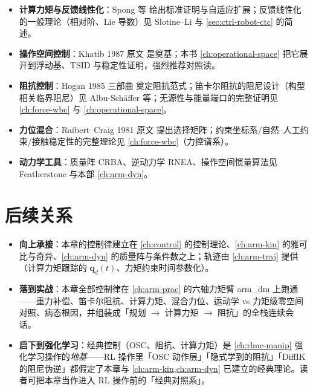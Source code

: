 \begin{itemize}
  \item \textbf{计算力矩与反馈线性化}：Spong 等\cite{spong2006robot} 给出标准证明与自适应扩展；反馈线性化的一般理论（相对阶、Lie 导数）见 Slotine--Li\cite{slotine1991applied} 与 \cref{sec:ctrl-robot-ctc} 的简述。
  \item \textbf{操作空间控制}：Khatib 1987 原文\cite{khatib1987operational} 是奠基；本书 \cref{ch:operational-space} 把它展开到浮动基、TSID 与稳定性证明，强烈推荐对照读。
  \item \textbf{阻抗控制}：Hogan 1985 三部曲\cite{hogan1985impedance} 奠定阻抗范式；笛卡尔阻抗的阻尼设计（构型相关临界阻尼）见 Albu-Schäffer 等\cite{albu2003cartesian}；无源性与能量端口的完整证明见 \cref{ch:force-wbc} 与 \cref{ch:operational-space}。
  \item \textbf{力位混合}：Raibert--Craig 1981 原文\cite{raibert1981hybrid} 提出选择矩阵；约束坐标系/自然--人工约束/接触稳定性的完整理论见 \cref{ch:force-wbc}（力控谱系）。
  \item \textbf{动力学工具}：质量阵 CRBA、逆动力学 RNEA、操作空间惯量算法见 Featherstone\cite{featherstone2008rbda} 与本部 \cref{ch:arm-dyn}。
\end{itemize}

\section{后续关系}
\label{sec:actrl-next}

\begin{itemize}
  \item \textbf{向上承接}：本章的控制律建立在 \cref{ch:control} 的控制理论、\cref{ch:arm-kin} 的雅可比与奇异、\cref{ch:arm-dyn} 的质量阵与条件数之上；轨迹由 \cref{ch:arm-traj} 提供（计算力矩跟踪的 $\mathbf{q}_d(t)$、力矩约束时间参数化）。
  \item \textbf{落到实战}：本章全部控制律在 \cref{ch:arm-prac} 的六轴力矩臂 arm\_dm 上跑通——重力补偿、笛卡尔阻抗、计算力矩、混合力位、运动学 vs 力矩级零空间对照、病态根因，并组装成「规划 $\to$ 计算力矩 $\to$ 阻抗」的全栈连续会话。
  \item \textbf{启下到强化学习}：经典控制（OSC、阻抗、计算力矩）是 \cref{ch:rlmc-manip} 强化学习操作的\emph{地基}——RL 操作里「OSC 动作层」「隐式学到的阻抗」「DiffIK 的阻尼伪逆」都假定了本章与 \cref{ch:arm-kin,ch:arm-dyn} 已建立的经典理论。读者可把本章当作进入 RL 操作前的「经典对照系」。
\end{itemize}

